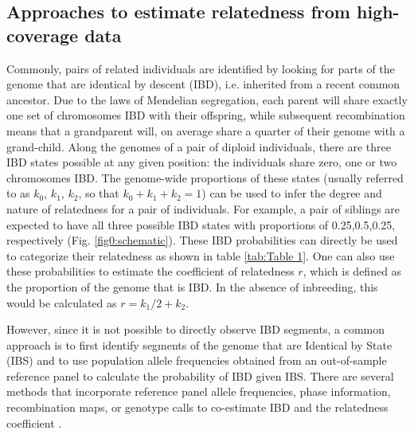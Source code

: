 \documentclass[12pt, letterpaper]{article}
\begin{document}
\subsection{Approaches to estimate relatedness from high-coverage data}

Commonly, pairs of related individuals are identified by looking for parts of the genome that are identical by descent (IBD), i.e. inherited from a recent common ancestor. Due to the laws of Mendelian segregation, each parent will share exactly one set of chromosomes IBD with their offspring, while subsequent recombination means that a grandparent will, on average share a quarter of their genome with a grand-child. Along the genomes of a pair of diploid individuals, there are three IBD states possible at any given position: the individuals share zero, one or two chromosomes IBD. The genome-wide proportions of these states (usually referred to as $k_0$, $k_1$, $k_2$, so that $k_0+k_1+k_2=1$) can be used to infer the degree and nature of relatedness for a pair of individuals. For example, a pair of siblings are expected to have all three possible IBD states with proportions of 0.25,0.5,0.25, respectively (Fig. \ref{fig0:schematic}). These IBD probabilities can directly be used to categorize their relatedness as shown in table \ref{tab:Table 1}. One can also use these probabilities to estimate the coefficient of relatedness $r$, which is defined as the proportion of the genome that is IBD. In the absence of inbreeding, this would be calculated as $r= k_1/2 + k_2$.

However, since it is not possible to directly observe IBD segments, a common approach is to first identify segments of the genome that are Identical by State (IBS) and to use population allele frequencies obtained from an out-of-sample reference panel to calculate the probability of IBD given IBS. There are several methods that incorporate reference panel allele frequencies, phase information, recombination maps, or genotype calls to co-estimate IBD and the relatedness coefficient \cite{huff_maximum-likelihood_2011,li_relationship_2014,thornton_estimating_2012, boehnke_accurate_1997,lynch_estimation_1999, purcell_plink_2007,manichaikul_robust_2010,gusev_whole_2009,nyerki_optimized_2022,browning_fast_2011,li_accurate_2014}.
\end{document}
